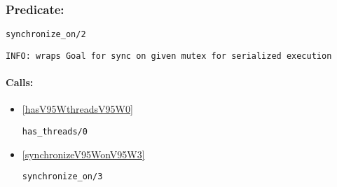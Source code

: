 \subsubsection{Predicate:} \label{synchronizeV95WonV95W2}

\begin{verbatim}
synchronize_on/2
\end{verbatim}

{\small \begin{verbatim}
INFO: wraps Goal for sync on given mutex for serialized execution

\end{verbatim}}
\paragraph{Calls:} 
\begin{itemize}
\item \ref{hasV95WthreadsV95W0} 
\begin{verbatim}
has_threads/0
\end{verbatim}

\item \ref{synchronizeV95WonV95W3} 
\begin{verbatim}
synchronize_on/3
\end{verbatim}

\end{itemize}

